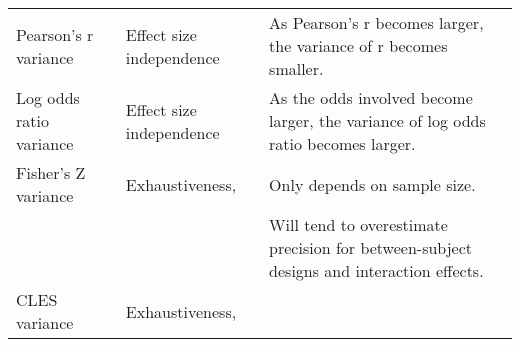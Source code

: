 \documentclass[]{article}
\begin{document}
\begin{longtable}[]{@{}lll@{}}
\begin{minipage}[t]{0.18\columnwidth}\raggedright
Pearson's r variance\strut
\end{minipage} & \begin{minipage}[t]{0.10\columnwidth}\raggedright
Effect size independence\strut
\end{minipage} & \begin{minipage}[t]{0.63\columnwidth}\raggedright
As Pearson's r becomes larger, the variance of r becomes smaller.\strut
\end{minipage}\tabularnewline
\begin{minipage}[t]{0.18\columnwidth}\raggedright
Log odds ratio variance\strut
\end{minipage} & \begin{minipage}[t]{0.10\columnwidth}\raggedright
Effect size independence\strut
\end{minipage} & \begin{minipage}[t]{0.63\columnwidth}\raggedright
As the odds involved become larger, the variance of log odds ratio
becomes larger.\strut
\end{minipage}\tabularnewline
\begin{minipage}[t]{0.18\columnwidth}\raggedright
Fisher's Z variance\strut
\end{minipage} & \begin{minipage}[t]{0.10\columnwidth}\raggedright
Exhaustiveness,\strut
\end{minipage} & \begin{minipage}[t]{0.63\columnwidth}\raggedright
Only depends on sample size.\strut
\end{minipage}\tabularnewline
\begin{minipage}[t]{0.18\columnwidth}\raggedright
\strut
\end{minipage} & \begin{minipage}[t]{0.10\columnwidth}\raggedright
\strut
\end{minipage} & \begin{minipage}[t]{0.63\columnwidth}\raggedright
Will tend to overestimate precision for between-subject designs and
interaction effects.\strut
\end{minipage}\tabularnewline
\begin{minipage}[t]{0.18\columnwidth}\raggedright
CLES variance\strut
\end{minipage} & \begin{minipage}[t]{0.10\columnwidth}\raggedright
Exhaustiveness,\strut
\end{minipage} & \begin{minipage}[t]{0.63\columnwidth}\raggedright

\end{minipage}
\end{longtable}
\end{document}
